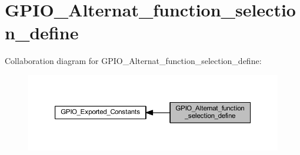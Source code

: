 \hypertarget{group___g_p_i_o___alternat__function__selection__define}{}\section{G\+P\+I\+O\+\_\+\+Alternat\+\_\+function\+\_\+selection\+\_\+define}
\label{group___g_p_i_o___alternat__function__selection__define}
Collaboration diagram for G\+P\+I\+O\+\_\+\+Alternat\+\_\+function\+\_\+selection\+\_\+define\+:
\nopagebreak
\begin{figure}[H]
\begin{center}
\leavevmode
\includegraphics[width=350pt]{group___g_p_i_o___alternat__function__selection__define}
\end{center}
\end{figure}
